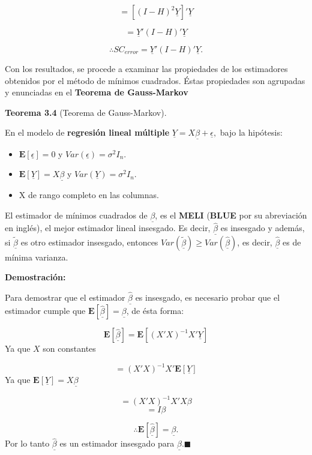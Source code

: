 \documentclass[a4paper,oneside,openany]{book}
\begin{document}
\[=[(I-H)^2\underline{Y}]'\underline{Y}\]

\[=\underline{Y}'(I-H)'\underline{Y}\]

\[\therefore SC_{error}=\underline{Y}'(I-H)'\underline{Y}.\]

Con los resultados, se procede a examinar las propiedades de los
estimadores obtenidos por el método de mínimos cuadrados. Éstas
propiedades son agrupadas y enunciadas en el \textbf{Teorema de
Gauss-Markov}

\textbf{Teorema 3.4} (Teorema de Gauss-Markov).

En el modelo de \textbf{regresión lineal múltiple}
\(\underline{Y}=X \underline{\beta}+ \underline{\epsilon},\) bajo la
hipótesis:

\begin{itemize}
\item
  \(\mathbf{E}[\underline{\epsilon}]=0\) y
  \(Var(\underline{\epsilon})=\sigma^2I_{n}.\)
\item
  \(\mathbf{E}[\underline{Y}]=X \underline{\beta}\) y
  \(Var(\underline{Y})=\sigma^2I_{n}.\)
\item
  X de rango completo en las columnas.
\end{itemize}

El estimador de mínimos cuadrados de \(\underline{\beta}\), es el
\textbf{MELI} (\textbf{BLUE} por su abreviación en inglés), el mejor
estimador lineal insesgado. Es decir, \(\underline{\hat{\beta}}\) es
insesgado y además, si \(\underline{\tilde{\beta}}\) es otro estimador
insesgado, entonces
\(Var(\underline{\tilde{\beta}})\geq Var(\underline{\hat{\beta}})\), es
decir, \(\underline{\hat{\beta}}\) es de mínima varianza.

\textbf{Demostración:}

Para demostrar que el estimador \(\underline{\hat{\beta}}\) es
insesgado, es necesario probar que el estimador cumple que
\(\mathbf{E}[\underline{\hat{\beta}}]=\underline{\beta}\), de ésta
forma:

\[\mathbf{E}[\underline{\hat{\beta}}]=\mathbf{E}[(X'X)^{-1}X'\underline{Y}]\]
Ya que \(X\) son constantes

\[=(X'X)^{-1}X'\mathbf{E}[\underline{Y}]\] Ya que
\(\mathbf{E}[\underline{Y}]=X\underline{\beta}\)

\[=(X'X)^{-1}X'X\beta\] \[=I\beta\]

\[\therefore \mathbf{E}[\underline{\hat{\beta}}]=\underline{\beta}.\]
Por lo tanto \(\underline{\hat{\beta}}\) es un estimador insesgado para
\(\underline{\beta}\).\(\blacksquare\)
\end{document}
